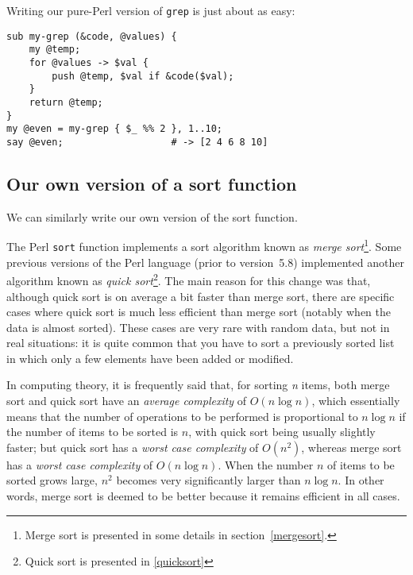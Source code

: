 Writing our pure-Perl version of {\tt grep} is just about as 
easy:
\begin{verbatim}
sub my-grep (&code, @values) { 
    my @temp;
    for @values -> $val {
        push @temp, $val if &code($val);
    }
    return @temp;
}
my @even = my-grep { $_ %% 2 }, 1..10; 
say @even;                   # -> [2 4 6 8 10]
\end{verbatim}

\subsection{Our own version of a sort function}
\label{combsort}

We can similarly write our own version of the sort 
function. 


The Perl {\tt sort} function implements a sort 
algorithm known as \emph{merge sort}\footnote{Merge 
sort is presented in some details in 
section~\ref{mergesort}.}.  Some 
previous versions of the Perl language (prior to 
version~5.8) implemented another algorithm known 
as \emph{quick sort}\footnote{Quick sort is presented 
in \ref{quicksort}}. The main reason for this 
change was that, although quick sort is on average  
a bit faster than merge sort, there are specific 
cases where quick sort is much less efficient than 
merge sort (notably when the data is almost sorted). 
These cases are very rare with random data, but not 
in real situations: it is quite common that you have 
to sort a previously sorted list in which only a 
few elements have been added or modified.

In computing theory, it is frequently said that, for 
sorting \emph{n} items, both merge sort and quick 
sort have an \emph{average complexity} of $O(n \log n)$, 
which essentially means that the number of operations 
to be performed is proportional to $n \log n$ if 
the number of items to be sorted is $n$, 
with quick sort being usually slightly faster; but 
quick sort has a \emph{worst case complexity} of 
$O(n^{2})$, whereas merge sort has a \emph{worst case 
complexity} of $O(n \log n)$. When the number $n$ of 
items to be sorted grows large, $n^{2}$ becomes 
very significantly larger than $n \log n$. In other 
words, merge sort is deemed to be better because it 
remains efficient in all cases.

